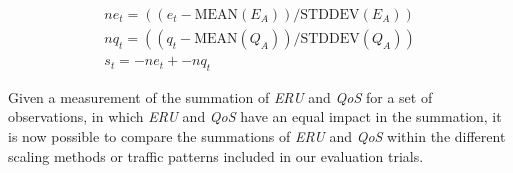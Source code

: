\begin{align*}
  ne_{t} = ((e_{t} - \mbox{MEAN}(E_{A})) / \mbox{STDDEV}(E_{A})) \\
  nq_{t} = ((q_{t} - \mbox{MEAN}(Q_{A})) / \mbox{STDDEV}(Q_{A})) \\
  s_{t} = -ne_{t} + -nq_{t}
\end{align*}

Given a measurement of the summation of \textit{ERU} and \textit{QoS} for a set
of observations, in which \textit{ERU} and \textit{QoS} have an equal impact in
the summation, it is now possible to compare the summations of \textit{ERU} and
\textit{QoS} within the different scaling methods or traffic patterns included
in our evaluation trials.
